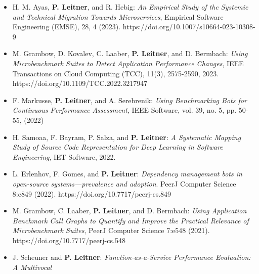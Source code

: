 \documentclass[paper=letter,fontsize=11pt]{scrartcl} %
\begin{document}
\begin{itemize}
  \item H. M. Ayas, \textbf{P. Leitner}, and R. Hebig: \emph{An Empirical Study of the Systemic and Technical Migration Towards Microservices}, Empirical Software Engineering (EMSE), 28, 4 (2023). https://doi.org/10.1007/s10664-023-10308-9  
  \item M. Grambow, D. Kovalev, C. Laaber, \textbf{P. Leitner}, and D. Bermbach: \emph{Using Microbenchmark Suites to Detect Application Performance Changes}, IEEE Transactions on Cloud Computing (TCC), 11(3), 2575-2590, 2023. https://doi.org/10.1109/TCC.2022.3217947  
  \item F. Markusse, \textbf{P. Leitner}, and A. Serebrenik: \emph{Using Benchmarking Bots for Continuous Performance Assessment}, IEEE Software, vol. 39, no. 5, pp. 50-55, (2022)  
  \item H. Samoaa, F. Bayram, P. Salza, and \textbf{P. Leitner}: \emph{A Systematic Mapping Study of Source Code Representation for Deep Learning in Software Engineering}, IET Software, 2022.
  \item L. Erlenhov,  F. Gomes, and \textbf{P. Leitner}: \emph{Dependency management bots in open-source systems—prevalence and adoption}. PeerJ Computer Science 8:e849 (2022). https://doi.org/10.7717/peerj-cs.849
  \item M. Grambow, C. Laaber, \textbf{P. Leitner}, and D. Bermbach: \emph{Using Application Benchmark Call Graphs
  to Quantify and Improve the Practical
  Relevance of Microbenchmark Suites}, PeerJ Computer Science 7:e548 (2021). https://doi.org/10.7717/peerj-cs.548
	\item  J. Scheuner and \textbf{P. Leitner}: \emph{Function-as-a-Service Performance Evaluation: A Multivocal
}
\end{itemize}
\end{document}
